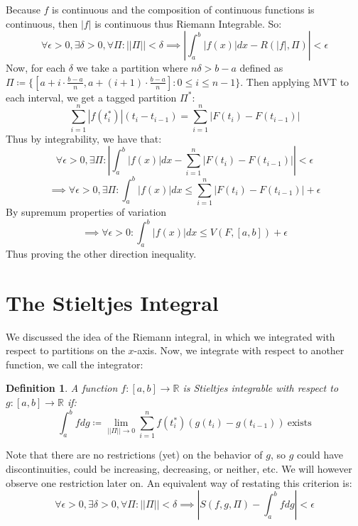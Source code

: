 \documentclass[10pt,letterpaper]{article} %
\newtheorem{defn}{Definition}[section]
\begin{document}
Because $f$ is continuous and the composition of continuous functions is continuous, then $|f|$ is continuous thus Riemann Integrable. So:
\begin{equation*}
  \forall \epsilon > 0, \exists \delta > 0, \forall \Pi: ||\Pi|| < \delta \implies \left|\int_{a}^{b}|f(x)|dx - R(|f|, \Pi)\right| < \epsilon
\end{equation*}
Now, for each $\delta$ we take a partition where $n\delta > b-a$ defined as $\Pi \coloneq \{[a+i \cdot \frac{b-a}{n}, a + (i+1)\cdot \frac{b-a}{n}] : 0 \leqslant i \leqslant n-1\}$. Then applying MVT to each interval, we get a tagged partition $\Pi^*$:
\begin{equation*}
  \sum_{i=1}^{n}|f(t_i^*)|(t_i - t_{i-1}) = \sum_{i=1}^{n}|F(t_i) - F(t_{i-1})|
\end{equation*}
Thus by integrability, we have that:
\begin{equation*}
  \forall \epsilon > 0, \exists \Pi: \left|\int_{a}^{b}|f(x)|dx - \sum_{i=1}^{n}|F(t_i) - F(t_{i-1})|\right| < \epsilon
\end{equation*}
\begin{equation*}
  \implies \forall \epsilon > 0, \exists \Pi: \int_{a}^{b}|f(x)|dx \leqslant \sum_{i=1}^n|F(t_i) - F(t_{i-1})| + \epsilon
\end{equation*}
By supremum properties of variation
\begin{equation*}
  \implies \forall \epsilon > 0: \int_{a}^{b}|f(x)|dx \leqslant V(F, [a, b]) + \epsilon
\end{equation*}
Thus proving the other direction inequality.

\pagebreak
\section{The Stieltjes Integral}
We discussed the idea of the Riemann integral, in which we integrated with respect to partitions on the $x$-axis. Now, we integrate with respect to another function, we call the integrator:
\begin{defn}
A function $f: [a, b] \xrightarrow{} \mathbb{R}$ is Stieltjes integrable with respect to $g: [a, b] \xrightarrow{} \mathbb{R}$ if:
\begin{equation*}
  \int_{a}^{b}f dg \coloneq \lim_{||\Pi|| \xrightarrow{} 0}\sum_{i=1}^{n}f(t_i^*)(g(t_i) - g(t_{i-1})) \ \text{exists}
\end{equation*}
\end{defn}
Note that there are no restrictions (yet) on the behavior of $g$, so $g$ could have discontinuities, could be increasing, decreasing, or neither, etc. We will however observe one restriction later on. An equivalent way of restating this criterion is:
\begin{equation*}
  \forall \epsilon > 0, \exists \delta > 0, \forall \Pi: ||\Pi|| < \delta \implies \left|S(f, g, \Pi) - \int_{a}^{b}fdg\right| < \epsilon
\end{equation*}
\end{document}
